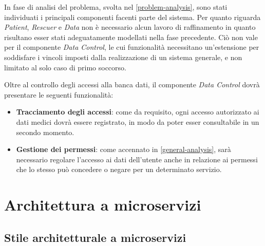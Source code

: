 \documentclass[a4paper,12pt]{report}
\begin{document}
In fase di analisi del problema, svolta nel \autoref{problem-analysis}, sono stati individuati i principali componenti facenti parte del sistema. Per quanto riguarda \emph{Patient}, \emph{Rescuer} e \emph{Data} non è necessario alcun lavoro di raffinamento in quanto risultano esser stati adeguatamente modellati nella fase precedente. Ciò non vale per il componente \emph{Data Control}, le cui funzionalità necessitano un'estensione per soddisfare i vincoli imposti dalla realizzazione di un sistema generale, e non limitato al solo caso di primo soccorso.

Oltre al controllo degli accessi alla banca dati, il componente \emph{Data Control} dovrà presentare le seguenti funzionalità:
\begin{itemize}
	\item \textbf{Tracciamento degli accessi}: come da requisito, ogni accesso autorizzato ai dati medici dovrà essere registrato, in modo da poter esser consultabile in un secondo momento.
	\item \textbf{Gestione dei permessi}: come accennato in \autoref{general-analysis}, sarà necessario regolare l'accesso ai dati dell'utente anche in relazione ai permessi che lo stesso può concedere o negare per un determinato servizio.
\end{itemize}

\section{Architettura a microservizi}

\subsection{Stile architetturale a microservizi}
\end{document}
